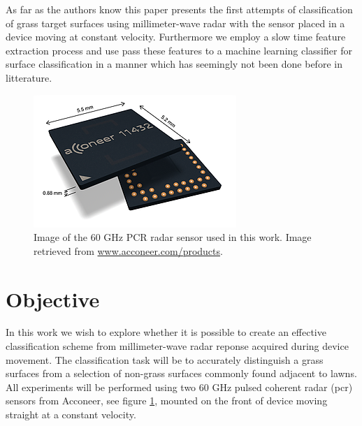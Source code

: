 
As far as the authors know this paper presents the first attempts of classification of grass target surfaces using millimeter-wave radar with the sensor placed in a device moving at constant velocity. Furthermore we employ a slow time feature extraction process and use pass these features to a machine learning classifier for surface classification in a manner which has seemingly not been done before in litterature. 

\begin{figure}
	\centering
	\includegraphics[scale=0.8]{figs_temp/acc_sensor}
	\caption{Image of the 60 GHz PCR radar sensor used in this work. Image retrieved from \url{www.acconeer.com/products}.}
	\label{fig:acc_sens}
\end{figure}

\section{Objective}

In this work we wish to explore whether it is possible to create an effective classification scheme from millimeter-wave radar reponse acquired during device movement. The classification task will be to accurately distinguish a grass surfaces from a selection of non-grass surfaces commonly found adjacent to lawns. All experiments will be performed using two 60 GHz pulsed coherent radar (\gls{pcr}) sensors from Acconeer, see figure \ref{fig:acc_sens}, mounted on the front of device moving straight at a constant velocity. 



